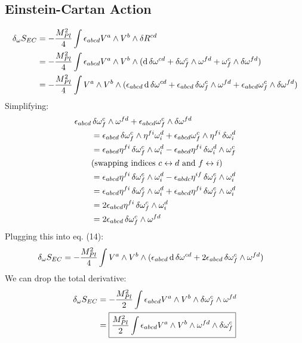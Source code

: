 \documentclass[12pt]{article}
\begin{document}
\subsection{Einstein-Cartan Action}
\begin{align}
  \var_\omega{S_{EC}} &= -\frac{M_{Pl}^2}{4} \int \epsilon_{abcd}V^a \wedge V^b \wedge \var{R^{cd}} \nonumber \\
  &= -\frac{M_{Pl}^2}{4} \int \epsilon_{abcd}V^a \wedge V^b \wedge (\dd{\var{\omega^{cd}}} + \var{\omega^c_f} \wedge \omega^{fd} + \omega^c_f \wedge \var{\omega^{fd}}) \nonumber \\
  &= -\frac{M_{Pl}^2}{4} \int V^a \wedge V^b \wedge (\epsilon_{abcd}\dd{\var{\omega^{cd}}} + \epsilon_{abcd}\var{\omega^c_f} \wedge \omega^{fd} + \epsilon_{abcd}\omega^c_f \wedge \var{\omega^{fd}})
\end{align}
Simplifying:
\begin{align*}
  \epsilon_{abcd}&\var{\omega^c_f} \wedge \omega^{fd} + \epsilon_{abcd}\omega^c_f \wedge \var{\omega^{fd}} \\
  &= \epsilon_{abcd}\var{\omega^c_f} \wedge \eta^{fi}\omega^d_i + \epsilon_{abcd}\omega^c_f \wedge \eta^{fi}\var{\omega^d_i} \\
  &= \epsilon_{abcd}\eta^{fi} \var{\omega^c_f} \wedge \omega^d_i - \epsilon_{abcd}\eta^{fi} \var{\omega^d_i} \wedge \omega^c_f \\
  &\text{(swapping indices $c \leftrightarrow d$ and $f \leftrightarrow i$)} \\
  &= \epsilon_{abcd}\eta^{fi} \var{\omega^c_f} \wedge \omega^d_i - \epsilon_{abdc}\eta^{if} \var{\omega^c_f} \wedge \omega^d_i \\
  &= \epsilon_{abcd}\eta^{fi} \var{\omega^c_f} \wedge \omega^d_i + \epsilon_{abcd}\eta^{fi} \var{\omega^c_f} \wedge \omega^d_i \\
  &= 2\epsilon_{abcd}\eta^{fi} \var{\omega^c_f} \wedge \omega^d_i \\
  &= 2\epsilon_{abcd} \var{\omega^c_f} \wedge \omega^{fd}
\end{align*}
Plugging this into eq. (14):
\begin{align*}
  \var_\omega{S_{EC}} &= -\frac{M_{Pl}^2}{4} \int V^a \wedge V^b \wedge (\epsilon_{abcd}\dd{\var{\omega^{cd}}} + 2\epsilon_{abcd} \var{\omega^c_f} \wedge \omega^{fd})
\end{align*}
We can drop the total derivative:
\begin{align}
  \var_\omega{S_{EC}} &= -\frac{M_{Pl}^2}{2} \int \epsilon_{abcd} V^a \wedge V^b \wedge \var{\omega^c_f} \wedge \omega^{fd} \nonumber \\
  &= \boxed{\frac{M_{Pl}^2}{2} \int \epsilon_{abcd} V^a \wedge V^b \wedge \omega^{fd} \wedge \var{\omega^c_f}}
\end{align}
\end{document}
